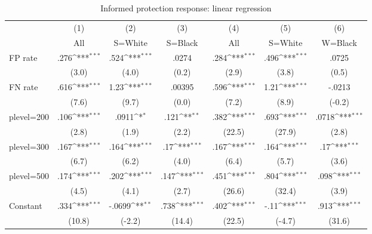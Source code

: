 \begin{table}[htbp]\centering
\def\sym#1{\ifmmode^{#1}\else\(^{#1}\)\fi}
\caption{Informed protection response: linear regression}
\begin{tabular}{l*{6}{c}}
\hline\hline
                &\multicolumn{1}{c}{(1)}&\multicolumn{1}{c}{(2)}&\multicolumn{1}{c}{(3)}&\multicolumn{1}{c}{(4)}&\multicolumn{1}{c}{(5)}&\multicolumn{1}{c}{(6)}\\
                &\multicolumn{1}{c}{All}&\multicolumn{1}{c}{S=White}&\multicolumn{1}{c}{S=Black}&\multicolumn{1}{c}{All}&\multicolumn{1}{c}{S=White}&\multicolumn{1}{c}{W=Black}\\
\hline
FP rate         &     .276\sym{***}&     .524\sym{***}&    .0274         &     .284\sym{***}&     .496\sym{***}&    .0725         \\
                &    (3.0)         &    (4.0)         &    (0.2)         &    (2.9)         &    (3.8)         &    (0.5)         \\
FN rate         &     .616\sym{***}&     1.23\sym{***}&   .00395         &     .596\sym{***}&     1.21\sym{***}&   -.0213         \\
                &    (7.6)         &    (9.7)         &    (0.0)         &    (7.2)         &    (8.9)         &   (-0.2)         \\
plevel=200      &     .106\sym{***}&    .0911\sym{*}  &     .121\sym{**} &     .382\sym{***}&     .693\sym{***}&    .0718\sym{***}\\
                &    (2.8)         &    (1.9)         &    (2.2)         &   (22.5)         &   (27.9)         &    (2.8)         \\
plevel=300      &     .167\sym{***}&     .164\sym{***}&      .17\sym{***}&     .167\sym{***}&     .164\sym{***}&      .17\sym{***}\\
                &    (6.7)         &    (6.2)         &    (4.0)         &    (6.4)         &    (5.7)         &    (3.6)         \\
plevel=500      &     .174\sym{***}&     .202\sym{***}&     .147\sym{***}&     .451\sym{***}&     .804\sym{***}&     .098\sym{***}\\
                &    (4.5)         &    (4.1)         &    (2.7)         &   (26.6)         &   (32.4)         &    (3.9)         \\
Constant        &     .334\sym{***}&   -.0699\sym{**} &     .738\sym{***}&     .402\sym{***}&     -.11\sym{***}&     .913\sym{***}\\
                &   (10.8)         &   (-2.2)         &   (14.4)         &   (22.5)         &   (-4.7)         &   (31.6)         \\

\end{tabular}
\end{table}
